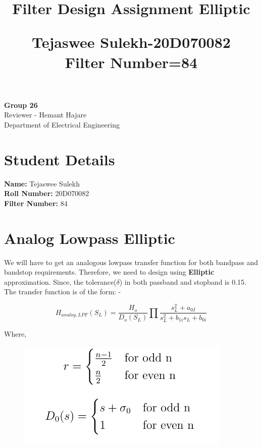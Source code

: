 \documentclass[12pt, letterpaper,]{article}
\begin{document}
\sffamily
\title{\Large{\textbf{Filter Design Assignment Elliptic}}\\
\author{}
               Tejaswee Sulekh-20D070082 \\ Filter Number=84}
\date{}
\maketitle 
\vspace{65mm}
\begin{center} \centering
\Large{\textbf{Group 26}}\\
    \large{Reviewer - Hemant Hajare}\\
    \Large{Department of Electrical Engineering}
\end{center}
\newpage
\tableofcontents
\newpage
\section{Student Details}
\textbf{Name:}\hspace{2.3cm} Tejaswee Sulekh\\
\textbf{Roll Number:}\hspace{1cm} 20D070082\\
\textbf{Filter Number:}\hspace{0.7cm} 84\\

\section{Analog Lowpass Elliptic}
We will have to get an analogous lowpass transfer function for both bandpass and bandstop requirements. Therefore, we need to design using \textbf{Elliptic} approximation. Since, the tolerance($\delta$) in both passband and stopband is 0.15. The transfer function is of the form: - 

\begin{equation}
    H_{analog,LPF}(S_L) = \frac{H_o}{D_o(S_L)}\prod\frac{s_L^2 + a_{0I}}{s_L^2 + b_{1i}s_L + b_{0i}}
\end{equation}

Where, 

\begin{figure}[!ht]
\includegraphics[width=8 cm]{Eq1.png}
\centering
\vspace{-3mm}
\end{figure}
\end{document}
